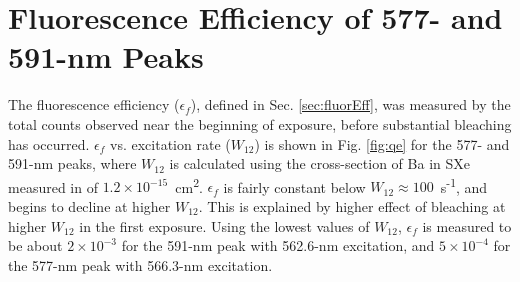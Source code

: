 

\section{Fluorescence Efficiency of 577- and 591-nm Peaks}

The fluorescence efficiency ($\epsilon_{f}$), defined in Sec. \ref{sec:fluorEff}, was measured by the total counts observed near the beginning of exposure, before substantial bleaching has occurred. $\epsilon_{f}$ vs. excitation rate ($W_{12}$) is shown in Fig. \ref{fig:qe} for the 577- and 591-nm peaks, where $W_{12}$ is calculated using the cross-section of Ba in SXe measured in \cite{Brian} of $1.2 \times 10^{-15}$~cm\textsuperscript{2}.  $\epsilon_{f}$ is fairly constant below $W_{12} \approx 100$~s\textsuperscript{-1}, and begins to decline at higher $W_{12}$.  This is explained by higher effect of bleaching at higher $W_{12}$ in the first exposure.  Using the lowest values of $W_{12}$, $\epsilon_{f}$ is measured to be about $2 \times 10^{-3}$ for the 591-nm peak with 562.6-nm excitation, and $5 \times 10^{-4}$ for the 577-nm peak with 566.3-nm excitation.


